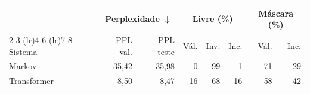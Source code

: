 \begin{tabular}{lrrrrrrr}
\toprule
 & \multicolumn{2}{c}{Perplexidade $\downarrow$} & \multicolumn{3}{c}{Livre (\%)} & \multicolumn{2}{c}{Máscara (\%)} \\
\cmidrule(lr){2-3} \cmidrule(lr){4-6} \cmidrule(lr){7-8}
Sistema & PPL val. & PPL teste & Vál. & Inv. & Inc. & Vál. & Inc. \\
\midrule
Markov & 35,42 & 35,98 & 0 & 99 & 1 & 71 & 29 \\
Transformer & 8,50 & 8,47 & 16 & 68 & 16 & 58 & 42 \\
\bottomrule
\end{tabular}
